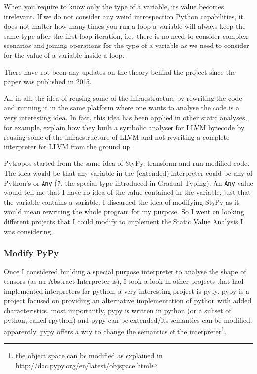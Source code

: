 When you require to know only the type of a variable, its value becomes
irrelevant. If we do not consider any weird introspection Python
capabilities, it does not matter how many times you run a loop a
variable will always keep the same type after the first loop iteration,
i.e.~there is no need to consider complex scenarios and joining
operations for the type of a variable as we need to consider for the
value of a variable inside a loop.

There have not been any updates on the theory behind the project since
the paper was published in 2015.

All in all, the idea of reusing some of the infraestructure by rewriting
the code and running it in the same platform where one wants to analyse
the code is a very interesting idea. In fact, this idea has been applied
in other static analyses, for example, \textcite{lauko_symbolic_2018}
explain how they built a symbolic analyser for LLVM bytecode by reusing
some of the infraestructure of LLVM and not rewriting a complete
interpreter for LLVM from the ground up.

Pytropos started from the same idea of StyPy, transform and run modified
code. The idea would be that any variable in the (extended) interpreter
could be any of Python's or \texttt{Any} (\texttt{?}, the special type
introduced in Gradual Typing). An \texttt{Any} value would tell me that
I have no idea of the value contained in the variable, just that the
variable contains a variable. I discarded the idea of modifying StyPy as
it would mean rewriting the whole program for my purpose. So I went on
looking different projects that I could modify to implement the Static
Value Analysis I was considering.

\subsubsection*{Modify PyPy}

Once I considered building a special purpose interpreter to analyse the
shape of tensors (as an Abstract Interpreter is), I took a look in other
projects that had implemented interpreters for python. a very
interesting project is pypy. pypy \autocite{krekel_pypy_2007} is a
project focused on providing an alternative implementation of python
with added characteristics. most importantly, pypy is written in python
(or a subset of python, called rpython) and pypy can be extended/its
semantics can be modified. apparently, pypy offers a way to change the
semantics of the interpreter\footnote{the object space can be modified
  as explained in \url{http://doc.pypy.org/en/latest/objspace.html}}.

